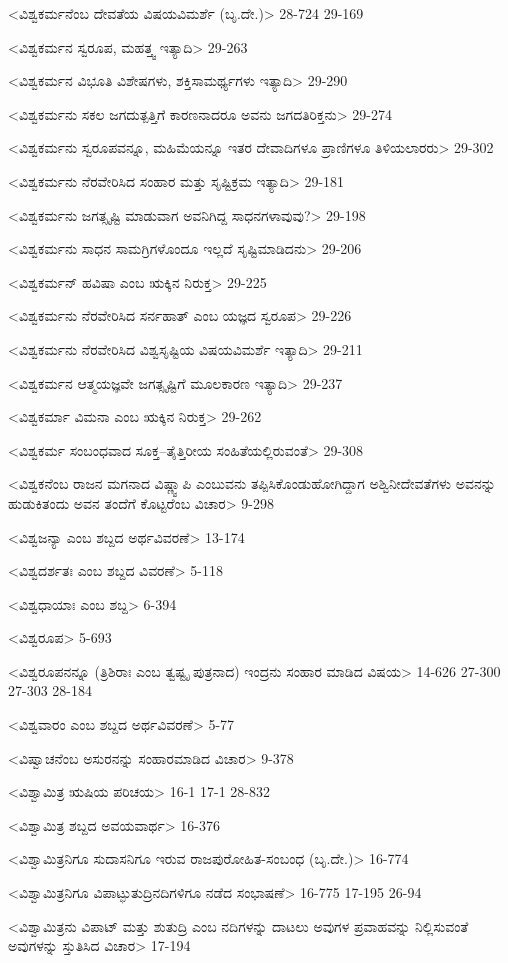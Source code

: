 <ವಿಶ್ವಕರ್ಮನೆಂಬ ದೇವತೆಯ ವಿಷಯವಿಮರ್ಶೆ (ಬೃ.ದೇ.)>
28-724 
29-169

<ವಿಶ್ವಕರ್ಮನ ಸ್ವರೂಪ, ಮಹತ್ತ್ವ ಇತ್ಯಾದಿ>
29-263

<ವಿಶ್ವಕರ್ಮನ ವಿಭೂತಿ ವಿಶೇಷಗಳು, ಶಕ್ತಿಸಾಮರ್ಥ್ಯಗಳು ಇತ್ಯಾದಿ>
29-290


<ವಿಶ್ವಕರ್ಮನು ಸಕಲ ಜಗದುತ್ಪತ್ತಿಗೆ ಕಾರಣನಾದರೂ ಅವನು ಜಗದತಿರಿಕ್ತನು>
29-274

<ವಿಶ್ವಕರ್ಮನು ಸ್ವರೂಪವನ್ನೂ, ಮಹಿಮೆಯನ್ನೂ ಇತರ ದೇವಾದಿಗಳೂ ಪ್ರಾಣಿಗಳೂ ತಿಳಿಯಲಾರರು>
29-302

<ವಿಶ್ವಕರ್ಮನು ನೆರವೇರಿಸಿದ ಸಂಹಾರ ಮತ್ತು ಸೃಷ್ಟಿಕ್ರಮ ಇತ್ಯಾದಿ>
29-181

<ವಿಶ್ವಕರ್ಮನು ಜಗತ್ಸೃಷ್ಟಿ ಮಾಡುವಾಗ ಅವನಿಗಿದ್ದ ಸಾಧನಗಳಾವುವು?>
29-198

<ವಿಶ್ವಕರ್ಮನು ಸಾಧನ ಸಾಮಗ್ರಿಗಳೊಂದೂ ಇಲ್ಲದೆ ಸೃಷ್ಟಿಮಾಡಿದನು>
29-206

<ವಿಶ್ವಕರ್ಮನ್‍ ಹವಿಷಾ ಎಂಬ ಋಕ್ಕಿನ ನಿರುಕ್ತ>
29-225

<ವಿಶ್ವಕರ್ಮನು ನೆರವೇರಿಸಿದ ಸರ್ನಹಾತ್‍ ಎಂಬ ಯಜ್ಞದ ಸ್ವರೂಪ>
29-226

<ವಿಶ್ವಕರ್ಮನು ನೆರವೇರಿಸಿದ ವಿಶ್ವಸೃಷ್ಟಿಯ ವಿಷಯವಿಮರ್ಶೆ ಇತ್ಯಾದಿ>
29-211

<ವಿಶ್ವಕರ್ಮನ ಆತ್ಮಯಜ್ಞವೇ ಜಗತ್ಸೃಷ್ಟಿಗೆ ಮೂಲಕಾರಣ ಇತ್ಯಾದಿ>
29-237

<ವಿಶ್ವಕರ್ಮಾ ವಿಮನಾ ಎಂಬ ಋಕ್ಕಿನ ನಿರುಕ್ತ>
29-262

<ವಿಶ್ವಕರ್ಮ ಸಂಬಂಧವಾದ ಸೂಕ್ತ–ತೈತ್ತಿರೀಯ ಸಂಹಿತೆಯಲ್ಲಿರುವಂತೆ>
29-308

<ವಿಶ್ವಕನೆಂಬ ರಾಜನ ಮಗನಾದ ವಿಷ್ಣ್ವಾಪಿ ಎಂಬುವನು ತಪ್ಪಿಸಿಕೊಂಡುಹೋಗಿದ್ದಾಗ ಅಶ್ವಿನೀದೇವತೆಗಳು ಅವನನ್ನು ಹುಡುಕಿತಂದು ಅವನ ತಂದೆಗೆ ಕೊಟ್ಟರೆಂಬ ವಿಚಾರ>
9-298

<ವಿಶ್ವಜನ್ಯಾ ಎಂಬ ಶಬ್ದದ ಅರ್ಥವಿವರಣೆ>
13-174

<ವಿಶ್ವದರ್ಶತಃ ಎಂಬ ಶಬ್ದದ ವಿವರಣೆ>
5-118

<ವಿಶ್ವಧಾಯಾಃ ಎಂಬ ಶಬ್ದ>
6-394

<ವಿಶ್ವರೂಪ>
5-693

<ವಿಶ್ವರೂಪನನ್ನೂ (ತ್ರಿಶಿರಾಃ ಎಂಬ ತ್ವಷ್ಟೃ ಪುತ್ರನಾದ) ಇಂದ್ರನು ಸಂಹಾರ ಮಾಡಿದ ವಿಷಯ>
14-626
27-300 
27-303
28-184

<ವಿಶ್ವವಾರಂ ಎಂಬ ಶಬ್ದದ ಅರ್ಥವಿವರಣೆ>
5-77

<ವಿಷ್ವಾಚನೆಂಬ ಅಸುರನನ್ನು ಸಂಹಾರಮಾಡಿದ ವಿಚಾರ>
9-378

<ವಿಶ್ವಾಮಿತ್ರ ಋಷಿಯ ಪರಿಚಯ>
16-1 
17-1
28-832

<ವಿಶ್ವಾಮಿತ್ರ ಶಬ್ದದ ಅವಯವಾರ್ಥ>
16-376

<ವಿಶ್ವಾಮಿತ್ರನಿಗೂ ಸುದಾಸನಿಗೂ ಇರುವ ರಾಜಪುರೋಹಿತ-ಸಂಬಂಧ (ಬೃ.ದೇ.)>
16-774

<ವಿಶ್ವಾಮಿತ್ರನಿಗೂ ವಿಪಾಟ್ಫುತುದ್ರಿನದಿಗಳಿಗೂ ನಡೆದ ಸಂಭಾಷಣೆ>
16-775 
17-195
26-94

<ವಿಶ್ವಾಮಿತ್ರನು ವಿಪಾಟ್‍ ಮತ್ತು ಶುತುದ್ರಿ ಎಂಬ ನದಿಗಳನ್ನು ದಾಟಲು ಅವುಗಳ ಪ್ರವಾಹವನ್ನು ನಿಲ್ಲಿಸುವಂತೆ ಅವುಗಳನ್ನು ಸ್ತುತಿಸಿದ ವಿಚಾರ>
17-194

